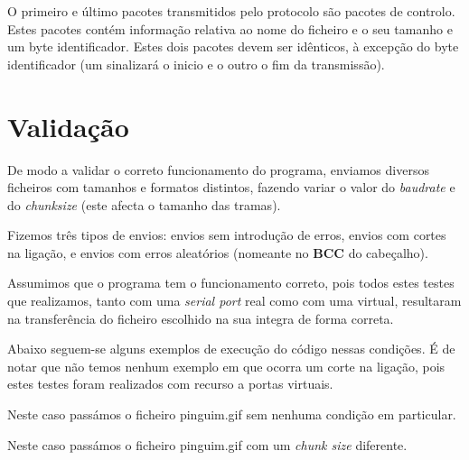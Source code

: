 \documentclass[11pt]{report}
\begin{document}
O primeiro e último pacotes transmitidos pelo protocolo são pacotes de controlo.
Estes pacotes contém informação relativa ao nome do ficheiro e o seu tamanho e
um byte identificador. Estes dois pacotes devem ser idênticos, à excepção do byte
identificador (um sinalizará o inicio e o outro o fim da transmissão).

{\let\clearpage\relax \chapter{Validação}}

De modo a validar o correto funcionamento do programa, enviamos diversos ficheiros
com tamanhos e formatos distintos, fazendo variar o valor do \textit{baudrate}
e do \textit{chunksize} (este afecta o tamanho das tramas).

Fizemos três tipos de envios: envios sem introdução de erros, envios com cortes
na ligação, e envios com erros aleatórios (nomeante no \textbf{BCC} do cabeçalho).

Assumimos que o programa tem o funcionamento correto, pois todos estes testes
que realizamos, tanto com uma \textit{serial port} real como com uma virtual,
resultaram na transferência do ficheiro escolhido na sua integra de forma correta.

Abaixo seguem-se alguns exemplos de execução do código nessas condições. É de notar
que não temos nenhum exemplo em que ocorra um corte na ligação, pois estes testes
foram realizados com recurso a portas virtuais.

Neste caso passámos o ficheiro pinguim.gif sem nenhuma condição em particular.

Neste caso passámos o ficheiro pinguim.gif com um \textit{chunk size} diferente.
\end{document}
